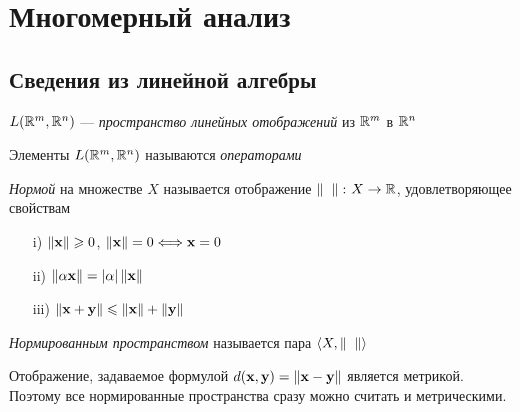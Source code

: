 \newcommand{\x}{\elx}
\newcommand{\y}{\ely}
\newcommand{\h}{\elh}
\newcommand{\w}{\elw}
\newcommand{\z}{\elz}
\newcommand{\Od}{\cO}
\newcommand{\N}{\bN}
\renewcommand{\C}{\bC}

\chapter{Многомерный анализ}

\section{Сведения из линейной алгебры}

\begin{definition}
    $L(\mathbb{R}^m, \mathbb{R}^n)$ --- \textit{пространство линейных отображений} из $\mathbb{R}^m$ в $\mathbb{R}^n$
\end{definition}

\begin{definition}
    Элементы $L(\mathbb{R}^m, \mathbb{R}^n)$ называются \textit{операторами}
\end{definition}

\begin{definition}
    \textit{Нормой} на множестве $X$ называется отображение
     $\left\lVert\phantom{x}\right\rVert \colon X \to \mathbb{R}$, удовлетворяющее свойствам
     \begin{itemize}
         \item[i)] $\norm{\x} \geqslant 0$, $\norm{\x} = 0 \Llra \x = 0$
         \item[ii)] $\norm{\a\x} = |\a|\norm{\x}$
         \item[iii)] $\norm{\x + \y} \leqslant \norm{\x} + \norm{\y}$
     \end{itemize}
\end{definition}

\begin{definition}
    \textit{Нормированным пространством} называется пара $\langle X,
    \left\lVert\phantom{x}\right\rVert \rangle$
\end{definition}

\begin{remark}
    Отображение, задаваемое формулой $d(\x, \y) = \norm{\x - \y}$ является
    метрикой. Поэтому все нормированные пространства сразу можно считать
    и метрическими.
\end{remark}

